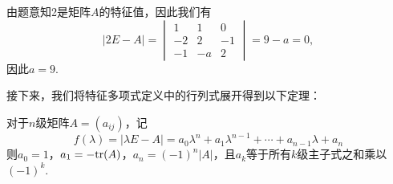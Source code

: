 \begin{solution}
    由题意知2是矩阵$A$的特征值，因此我们有
    \[|2E-A|=\begin{vmatrix}
            1 & 1 & 0 \\ -2 & 2 & -1 \\ -1 & -a & 2
        \end{vmatrix}=9-a=0,\]
    因此$a=9$.
\end{solution}

接下来，我们将特征多项式定义中的行列式展开得到以下定理：
\begin{theorem}\label{thm:18:特征多项式展开}
    对于$n$级矩阵$A=(a_{ij})$，记
    \[f(\lambda)=|\lambda E-A|=a_0\lambda^n+a_1\lambda^{n-1}+\cdots+a_{n-1}\lambda+a_n\]
    则$a_0=1$，$a_1=-\textup{tr}(A)$，$a_n=(-1)^n|A|$，且$a_k$等于所有$k$级主子式之和乘以$(-1)^k$.
\end{theorem}

